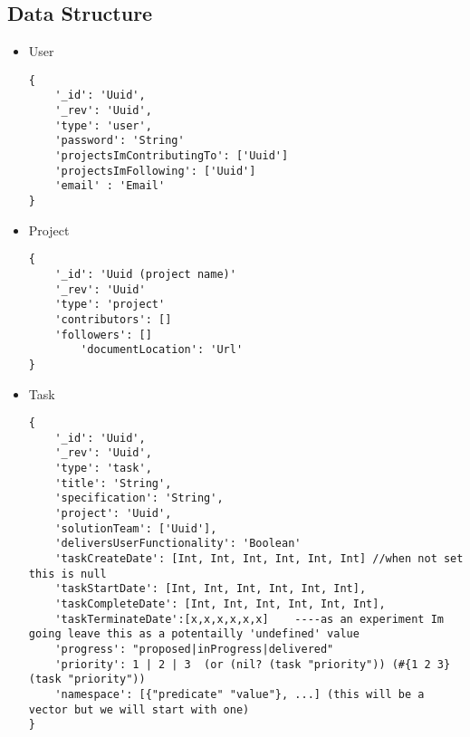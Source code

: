 \documentclass{article}
\begin{document}
\begin{description}
\section{Data Structure}
\begin{itemize}
\item User
\begin{verbatim}
{
	'_id': 'Uuid',
	'_rev': 'Uuid',
	'type': 'user',
	'password': 'String'
	'projectsImContributingTo': ['Uuid']
	'projectsImFollowing': ['Uuid']
	'email' : 'Email'
}
\end{verbatim}
\item Project
\begin{verbatim}
{
	'_id': 'Uuid (project name)'
	'_rev': 'Uuid'
	'type': 'project'
	'contributors': []
	'followers': []
        'documentLocation': 'Url'
}
\end{verbatim}
\item Task
\begin{verbatim}
{
	'_id': 'Uuid',
	'_rev': 'Uuid',
	'type': 'task',
	'title': 'String', 
	'specification': 'String',
	'project': 'Uuid',
	'solutionTeam': ['Uuid'],
	'deliversUserFunctionality': 'Boolean'
	'taskCreateDate': [Int, Int, Int, Int, Int, Int] //when not set this is null
	'taskStartDate': [Int, Int, Int, Int, Int, Int],
	'taskCompleteDate': [Int, Int, Int, Int, Int, Int],
	'taskTerminateDate':[x,x,x,x,x,x]    ----as an experiment Im going leave this as a potentailly 'undefined' value
	'progress': "proposed|inProgress|delivered"
	'priority': 1 | 2 | 3  (or (nil? (task "priority")) (#{1 2 3} (task "priority"))
	'namespace': [{"predicate" "value"}, ...] (this will be a vector but we will start with one)
}
\end{verbatim}

\end{itemize}

\end{description}
\end{document}
